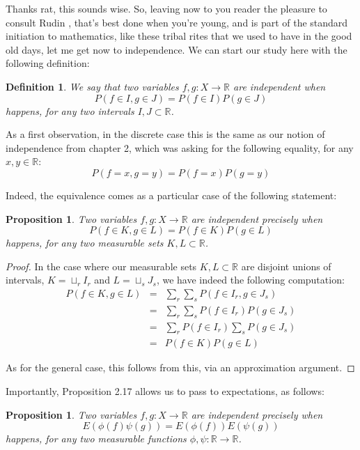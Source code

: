 \documentclass[12pt]{amsbook}
\newtheorem{definition}[theorem]{Definition}
\newtheorem{proposition}[theorem]{Proposition}
\begin{document}
Thanks rat, this sounds wise. So, leaving now to you reader the pleasure to consult Rudin \cite{rud}, that's best done when you're young, and is part of the standard initiation to mathematics, like these tribal rites that we used to have in the good old days, let me get now to independence. We can start our study here with the following definition:


\begin{definition}
We say that two variables $f,g:X\to\mathbb R$ are independent when
$$P(f\in I,g\in J)=P(f\in I)P(g\in J)$$
happens, for any two intervals $I,J\subset\mathbb R$.
\end{definition}

As a first observation, in the discrete case this is the same as our notion of independence from chapter 2, which was asking for the following equality, for any $x,y\in\mathbb R$:
$$P(f=x,g=y)=P(f=x)P(g=y)$$

Indeed, the equivalence comes as a particular case of the following statement:

\begin{proposition}
Two variables $f,g:X\to\mathbb R$ are independent precisely when
$$P(f\in K,g\in L)=P(f\in K)P(g\in L)$$
happens, for any two measurable sets $K,L\subset\mathbb R$.
\end{proposition}

\begin{proof}
In the case where our measurable sets $K,L\subset\mathbb R$ are disjoint unions of intervals, $K=\sqcup_rI_r$ and $L=\sqcup_sJ_s$, we have indeed the following computation:
\begin{eqnarray*}
P(f\in K,g\in L)
&=&\sum_r\sum_sP(f\in I_r,g\in J_s)\\
&=&\sum_r\sum_sP(f\in I_r)P(g\in J_s)\\
&=&\sum_rP(f\in I_r)\sum_sP(g\in J_s)\\
&=&P(f\in K)P(g\in L)
\end{eqnarray*}

As for the general case, this follows from this, via an approximation argument.
\end{proof}

Importantly, Proposition 2.17 allows us to pass to expectations, as follows:

\begin{proposition}
Two variables $f,g:X\to\mathbb R$ are independent precisely when
$$E(\phi(f)\psi(g))=E(\phi(f))E(\psi(g))$$
happens, for any two measurable functions $\phi,\psi:\mathbb R\to\mathbb R$.
\end{proposition}
\end{document}
